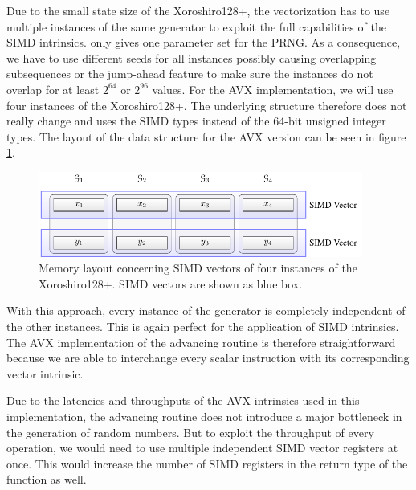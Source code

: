 \documentclass{stdlocal}
\begin{document}
    Due to the small state size of the Xoroshiro128+, the vectorization has to use multiple instances of the same generator to exploit the full capabilities of the SIMD intrinsics.
    \citeauthor{vigna-xoroshiro} only gives one parameter set for the PRNG.
    As a consequence, we have to use different seeds for all instances possibly causing overlapping subsequences or the jump-ahead feature to make sure the instances do not overlap for at least $2^{64}$ or $2^{96}$ values.
    For the AVX implementation, we will use four instances of the Xoroshiro128+.
    The underlying structure therefore does not really change and uses the SIMD types instead of the 64-bit unsigned integer types.
    The layout of the data structure for the AVX version can be seen in figure \ref{fig:xoroshiro-vector-layout}.

    \begin{figure}
      \center
      \includegraphics[width=0.95\textwidth]{figures/xrsr128p_vector_layout.pdf}
      \caption[Xoroshiro128+ Vector Layout]{%
        Memory layout concerning SIMD vectors of four instances of the Xoroshiro128+.
        SIMD vectors are shown as blue box.
      }
      \label{fig:xoroshiro-vector-layout}
    \end{figure}

    With this approach, every instance of the generator is completely independent of the other instances.
    This is again perfect for the application of SIMD intrinsics.
    The AVX implementation of the advancing routine is therefore straightforward because we are able to interchange every scalar instruction with its corresponding vector intrinsic.

    Due to the latencies and throughputs of the AVX intrinsics used in this implementation, the advancing routine does not introduce a major bottleneck in the generation of random numbers.
    But to exploit the throughput of every operation, we would need to use multiple independent SIMD vector registers at once.
    This would increase the number of SIMD registers in the return type of the function as well.
\end{document}
